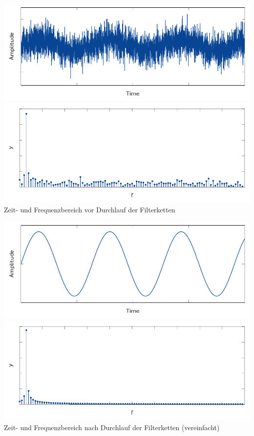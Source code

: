 {    \begin{minipage}{0.32\textwidth}
        \begin{center}
            \vspace{3ex}
            \includegraphics[width=\textwidth]{images/noisySine.pdf}
            \includegraphics[width=\textwidth]{images/noisySineFFT.pdf}
            \footnotesize{Zeit- und Frequenzbereich vor Durchlauf der Filterketten}
            \vspace{4ex}

            \includegraphics[width=\textwidth]{images/sine.pdf}
            \includegraphics[width=\textwidth]{images/sineFFT.pdf}
            \footnotesize{Zeit- und Frequenzbereich nach Durchlauf der Filterketten (vereinfacht)}
        \end{center}
    \end{minipage}

}
